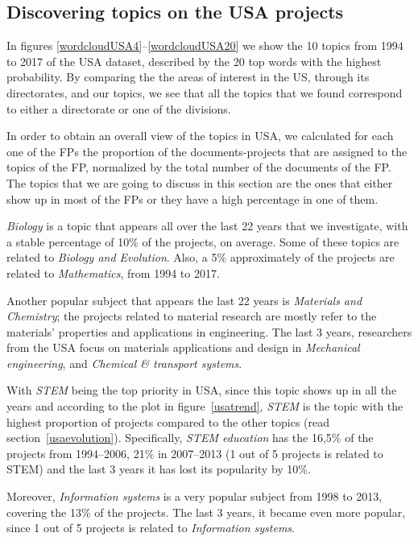 \documentclass[12pt]{report}
\begin{document}
\vfill
\subsection{Discovering topics on the USA projects}

In figures \ref{wordcloudUSA4}--\ref{wordcloudUSA20} we show the 10 topics 
from 1994 to 2017 of the USA dataset, described by
the 20 top words with the highest probability.
By comparing the the areas of interest in the US, through its directorates, 
and our topics, we see that all the topics that we found correspond to either 
a directorate or one of the divisions.

In order to obtain an overall view of the topics in USA, we calculated for each
one of the FPs the proportion of the documents-projects that are assigned to the
topics of the FP, normalized by the total number of the documents of the FP. The
topics that we are going to discuss in this section are the ones that either
show up in most of the FPs or they have a high percentage in one of them.

\emph{Biology} is a topic that appears all over the last 22 years that we
investigate, with a stable percentage of 10\% of the projects, on average. Some
of these topics are related to \emph{Biology and Evolution}. Also, a 5\%
approximately of the projects are related to \emph{Mathematics}, from 1994 to
2017.

Another popular subject that appears the last 22 years is \emph{Materials and
Chemistry}; the projects related to material research are mostly refer to the
materials' properties and applications in engineering. The last 3 years,
researchers from the USA focus on materials applications and design in
\emph{Mechanical engineering}, and \emph{Chemical \& transport systems}.

With \emph{STEM} being the top priority in USA, since this topic shows up in all
the years and according to the plot in figure~\ref{usatrend}, \emph{STEM} is the
topic with the highest proportion of projects compared to the other topics (read
section~\ref{usaevolution}). Specifically, \emph{STEM education} has the 16,5\%
of the projects from 1994--2006, 21\% in 2007--2013 (1 out of 5 projects is
related to STEM) and the last 3 years it has lost its popularity by 10\%.

Moreover, \emph{Information systems} is a very popular subject from 1998 to 2013, 
covering the 13\% of the projects. The last 3 years, it became even more popular, 
since 1 out of 5 projects is related to \emph{Information systems}.
\end{document}
